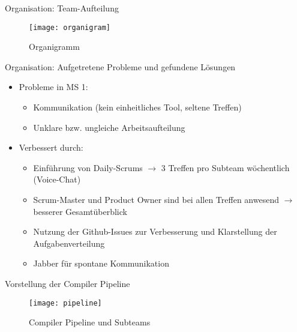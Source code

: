 \begin{frame}{Organisation: Team-Aufteilung}

\begin{figure}
  \begin{center}
    \leavevmode
      \texttt{[image: organigram]}
    \caption{Organigramm}
  \end{center}
\end{figure}

\end{frame}

\pagebreak

\begin{frame}{Organisation: Aufgetretene Probleme und gefundene L\"osungen}
	
	\pause
	\begin{itemize}
		\item Probleme in MS 1:
		\pause
		\begin{itemize}
			\item Kommunikation (kein einheitliches Tool, seltene Treffen)
			\pause
			\item Unklare bzw. ungleiche Arbeitsaufteilung
			\pause
		\end{itemize}
		\item Verbessert durch:
		\pause
		\begin{itemize}
			\item Einf\"uhrung von Daily-Scrums $\rightarrow$ 3 Treffen pro Subteam w\"ochentlich (Voice-Chat)
			\pause
			\item Scrum-Master und Product Owner sind bei allen Treffen anwesend $\rightarrow$ besserer Gesamt\"uberblick
			\pause
			\item Nutzung der Github-Issues zur Verbesserung und Klarstellung der Aufgabenverteilung
			\pause
			\item Jabber f\"ur spontane Kommunikation
		\end{itemize}
	\end{itemize}
	
\end{frame}

\begin{frame}{Vorstellung der Compiler Pipeline}

\begin{figure}
  \begin{center}
    \leavevmode
      \texttt{[image: pipeline]}
    \caption{Compiler Pipeline und Subteams}
  \end{center}
\end{figure}

\end{frame}
